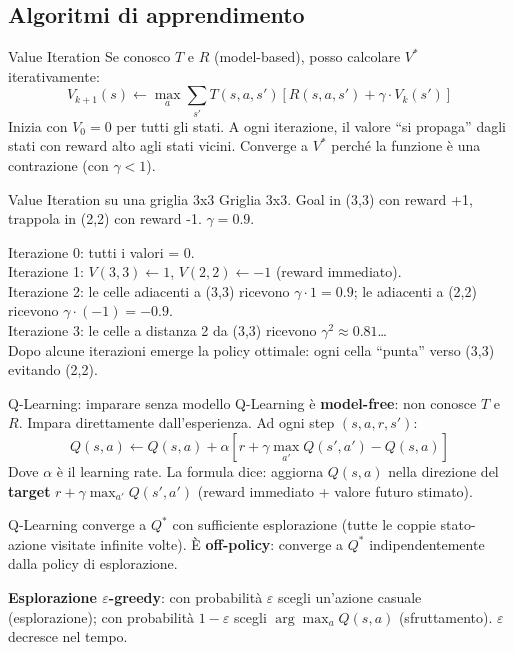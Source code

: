 \documentclass[12pt,a4paper]{article}
\begin{document}
\subsection{Algoritmi di apprendimento}

\begin{narrativo}{Value Iteration}
Se conosco $T$ e $R$ (model-based), posso calcolare $V^*$ iterativamente:
\[
V_{k+1}(s) \leftarrow \max_{a} \sum_{s'} T(s,a,s') \left[ R(s,a,s') + \gamma \cdot V_k(s') \right]
\]
Inizia con $V_0 = 0$ per tutti gli stati. A ogni iterazione, il valore ``si propaga'' dagli stati con reward alto agli stati vicini. Converge a $V^*$ perché la funzione è una contrazione (con $\gamma < 1$).
\end{narrativo}

\begin{esempio}{Value Iteration su una griglia 3x3}
Griglia 3x3. Goal in (3,3) con reward +1, trappola in (2,2) con reward -1. $\gamma = 0.9$.

Iterazione 0: tutti i valori = 0.\\
Iterazione 1: $V(3,3) \leftarrow 1$, $V(2,2) \leftarrow -1$ (reward immediato).\\
Iterazione 2: le celle adiacenti a (3,3) ricevono $\gamma \cdot 1 = 0.9$; le adiacenti a (2,2) ricevono $\gamma \cdot (-1) = -0.9$.\\
Iterazione 3: le celle a distanza 2 da (3,3) ricevono $\gamma^2 \approx 0.81$\ldots\\
Dopo alcune iterazioni emerge la policy ottimale: ogni cella ``punta'' verso (3,3) evitando (2,2).
\end{esempio}

\begin{narrativo}{Q-Learning: imparare senza modello}
Q-Learning è \textbf{model-free}: non conosce $T$ e $R$. Impara direttamente dall'esperienza. Ad ogni step $(s, a, r, s')$:
\[
Q(s,a) \leftarrow Q(s,a) + \alpha \left[ r + \gamma \max_{a'} Q(s',a') - Q(s,a) \right]
\]
Dove $\alpha$ è il learning rate. La formula dice: aggiorna $Q(s,a)$ nella direzione del \textbf{target} $r + \gamma \max_{a'} Q(s',a')$ (reward immediato + valore futuro stimato).

Q-Learning converge a $Q^*$ con sufficiente esplorazione (tutte le coppie stato-azione visitate infinite volte). È \textbf{off-policy}: converge a $Q^*$ indipendentemente dalla policy di esplorazione.

\textbf{Esplorazione $\varepsilon$-greedy}: con probabilità $\varepsilon$ scegli un'azione casuale (esplorazione); con probabilità $1-\varepsilon$ scegli $\arg\max_a Q(s,a)$ (sfruttamento). $\varepsilon$ decresce nel tempo.
\end{narrativo}
\end{document}
